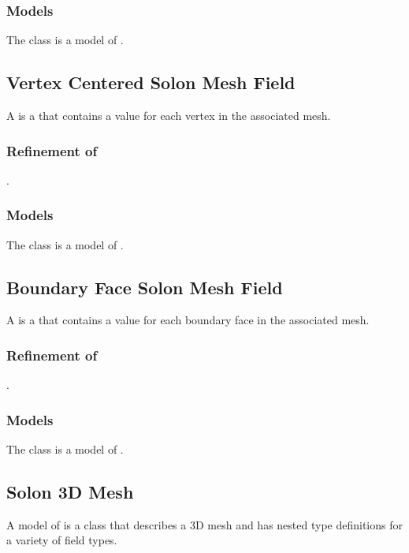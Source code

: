 \documentclass[note]{newmemo}
\begin{document}
\subsubsection{Models}

The  class is a model of .

\subsection{Vertex Centered Solon Mesh Field}

A  is a  that contains a value for each vertex in the associated mesh.

\subsubsection{Refinement of}
.

\subsubsection{Models}

The  class is a model of .

\bigskip

\subsection{Boundary Face Solon Mesh Field}

A  is a  that contains a value for each boundary face in the
associated mesh.

\subsubsection{Refinement of}
.

\subsubsection{Models}

The  class is a model of .


\newpage

\subsection{Solon 3D Mesh}
\label{sec:solon 3d mesh}
A model of  is a class that describes a
3D mesh and has nested type definitions for a variety of field types.
\end{document}
